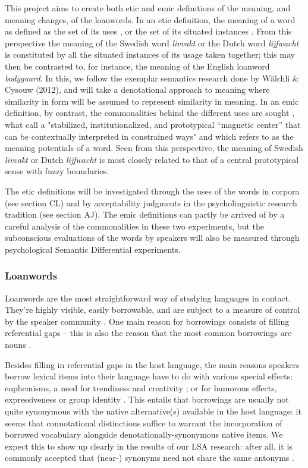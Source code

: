 \documentclass[a4paper]{article}
\begin{document}
This project aims to create both etic and emic definitions of the meaning, and meaning changes, of the loanwords. In an etic definition, the meaning of a word as defined as the set of its uses \citep{Koptjevskaja-Tamm2008}, or the set of its situated instances \citep{Evans2009}. From this perspective the meaning of the Swedish word \emph{livvakt} or the Dutch word \emph{lijfwacht} is constituted by all the situated instances of its usage taken together; this may then be contrasted to, for instance, the meaning of the English loanword \emph{bodyguard}. In this, we follow the exemplar semantics research done by W\"alchli \& Cysouw (2012), and will take a denotational approach to meaning where similarity in form will be assumed to represent similarity in meaning. In an emic definition, by contrast, the commonalities behind the different uses are sought \citep{Koptjevskaja-Tamm2008}, what \citet{Traugott2001} call a "stabilized, institutionalized, and prototypical “magnetic center” that can be contextually interpreted in constrained ways" and which \citet{Linell2005} refers to as the meaning potentials of a word. Seen from this perspective, the meaning of Swedish \emph{livvakt} or Dutch \emph{lijfwacht} is most closely related to that of a central prototypical sense with fuzzy boundaries.

The etic definitions will be investigated through the uses of the words in corpora (see section CL) and by acceptability judgments in the psycholinguistic research tradition (see section AJ). The emic definitions can partly be arrived of by a careful analysis of the commonalities in these two experiments, but the subconscious evaluations of the words by speakers will also be measured through psychological Semantic Differential experiments.




\subsubsection{Loanwords}
\label{sect_loanwords}
Loanwords are the most straightforward way of studying languages in contact. They're highly visible, easily borrowable, and are subject to a measure of control by the speaker community \citep{Thomason2001}. One main reason for borrowings consists of filling referential gaps -- this is also the reason that the most common borrowings are nouns \citep[cf.][p.168]{Matras2009}.

Besides filling in referential gaps in the host language, the main reasons speakers borrow lexical items into their language have to do with various special effects: euphemisms, a need for trendiness and creativity \citep[cf.][]{Rebuck2002}; or for humorous effects, expressiveness or group identity \citep[cf.][]{Gottlieb2006,Wennberg2010}. This entails that borrowings are usually not quite synonymous with the native alternative(s) available in the host language: it seems that connotational distinctions suffice to warrant the incorporation of borrowed vocabulary alongside denotationally-synonymous native items. We expect this to show up clearly in the results of our LSA research: after all, it is commonly accepted that (near-) synonyms need not share the same antonyms \citep[cf.][]{Miller1990}. 
\end{document}
